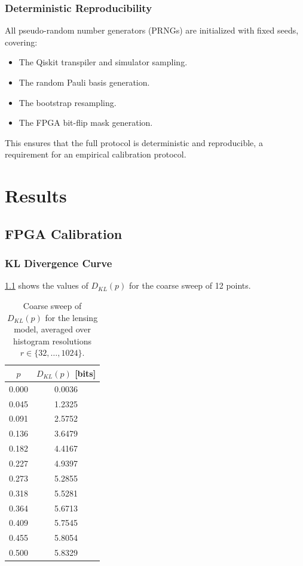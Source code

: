 \documentclass[12pt,a4paper,oneside]{book}
\theoremstyle{plain}
\theoremstyle{definition}
\theoremstyle{remark}
\begin{document}
\subsection{Deterministic Reproducibility}

All pseudo-random number generators (PRNGs) are initialized with fixed seeds, covering:
\begin{itemize}[itemsep=2pt]
    \item The Qiskit transpiler and simulator sampling.
    \item The random Pauli basis generation.
    \item The bootstrap resampling.
    \item The FPGA bit-flip mask generation.
\end{itemize}
This ensures that the full protocol is deterministic and reproducible, a requirement for an empirical calibration protocol.

\chapter{Results}
\label{chap:results}

\section{FPGA Calibration}
\label{sec:results_fpga}

\subsection{KL Divergence Curve}

\cref{tab:kl_curve} shows the values of $D_{KL}(p)$ for the coarse sweep of 12 points.

\begin{table}[H]
\centering
\caption{Coarse sweep of $D_{KL}(p)$ for the lensing model, averaged over histogram resolutions $r \in \{32,\dots,1024\}$.}
\label{tab:kl_curve}
\begin{tabular}{c|c}
\toprule
$p$ & $D_{KL}(p)$ [bits] \\
\midrule
0.000 & 0.0036 \\
0.045 & 1.2325 \\
0.091 & 2.5752 \\
0.136 & 3.6479 \\
0.182 & 4.4167 \\
0.227 & 4.9397 \\
0.273 & 5.2855 \\
0.318 & 5.5281 \\
0.364 & 5.6713 \\
0.409 & 5.7545 \\
0.455 & 5.8054 \\
0.500 & 5.8329 \\
\bottomrule
\end{tabular}
\end{table}
\end{document}
